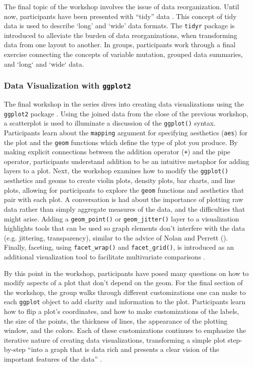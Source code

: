 \documentclass[12pt]{article}
\begin{document}
\quad The final topic of the workshop involves the issue of data reorganization.
Until now, participants have been presented with ``tidy'' data \citep{tidy}. 
This concept of tidy data is used to describe `long' and `wide' data
formats. The \texttt{tidyr} package \citep{tidyr} is introduced to alleviate the
burden of data reorganizations, when transforming data from one layout to
another. In groups, participants work through a final exercise connecting the
concepts of variable mutation, grouped data summaries, and `long` and `wide` 
data. 

\subsubsection{Data Visualization with \texttt{ggplot2}}
\label{sec:vizual} 

\noindent The final workshop in the series dives into creating data visualizations
using the \texttt{ggplot2} package \citep{ggplot}. Using the joined data from
the close of the previous workshop, a scatterplot is used to
illuminate a discussion of the \texttt{ggplot()} syntax. Participants learn
about the \texttt{mapping} argument
for specifying aesthetics (\texttt{aes}) for the plot and the \texttt{geom}
functions which define the type of plot you produce. By making
explicit connections between the addition operator (\texttt{+}) and the pipe
operator, participants understand addition to be an intuitive metaphor for
adding layers to a plot. Next, the workshop examines how to modify the
\texttt{ggplot()} aesthetics and geoms to create violin plots, density plots, 
bar charts, and line plots, allowing for participants to explore the 
\texttt{geom} functions and aesthetics that pair with each plot. A conversation
is had about the importance of plotting raw data rather than simply aggregate
measures of the data, and the difficulties that might arise. Adding a
\texttt{geom\_point()} or \texttt{geom\_jitter()} layer to a visualization
highlights tools that can be used so graph elements don't interfere with the
data (e.g. jittering, transparency), similar to the advice of Nolan and Perrett
(\citeyear{nolan-viz}). Finally, faceting, using \texttt{facet\_wrap()} and
\texttt{facet\_grid()}, is introduced as an additional visualization tool to
facilitate multivariate comparisons \citep[p.\ 261]{nolan-viz}. 

\quad By this point in the workshop, participants have posed many questions on
how to modify aspects of a plot that don't depend on the geom. For the final 
section of the workshop, the group walks through different customizations one 
can make to each \texttt{ggplot} object to add clarity and information to the 
plot. Participants learn how to flip a plot's coordinates, and how to make
customizations of the labels, the size of the points, the thickness of
lines, the appearance of the plotting window, and the colors. Each of
these customizations continues to emphasize the iterative nature 
of creating data visualizations, transforming a simple plot step-by-step ``into
a graph that is data rich and presents a clear vision of the important features
of the data'' \citep[p.\ 262]{nolan-viz}.
\end{document}
